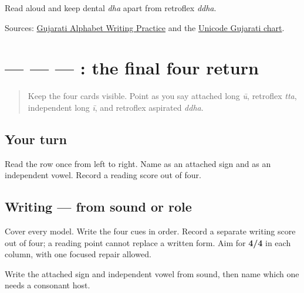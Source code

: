 \begin{tcolorbox}[breakable,colback=teal!4,colframe=teal!35!black,title={Before you move on}]
Read \textbf{ } aloud and keep dental \emph{dha} apart from retroflex \emph{ddha}.

Sources: \href{https://www.t30apps.com/gujarati-alphabet-writing/}{Gujarati Alphabet Writing Practice} and the \href{https://www.unicode.org/charts/PDF/U0A80.pdf}{Unicode Gujarati chart}.
\end{tcolorbox}
\section[\texorpdfstring{\gu{ૂ} — \gu{ટ} — \gu{ઈ} — \gu{ઢ} (attached long uu …)}{ૂ — ટ — ઈ — ઢ (attached long uu …)}]{ —  —  — : the final four return}

\label{lesson:GU-R07-second-four-r1}



\begin{quote}
Keep the four cards visible. Point as you say attached long \emph{ū}, retroflex \emph{tta}, independent long \emph{ī}, and retroflex aspirated \emph{ddha}.
\end{quote}

\subsection*{Your turn}
Read the row once from left to right. Name \textbf{} as an attached sign and \textbf{} as an independent vowel. Record a reading score out of four.

\subsection*{Writing — from sound or role}
Cover every model. Write the four cues in order. Record a separate writing score out of four; a reading point cannot replace a written form. Aim for \textbf{4/4} in each column, with one focused repair allowed.

\begin{tcolorbox}[breakable,colback=teal!4,colframe=teal!35!black,title={Before you move on}]
Write the attached sign and independent vowel from sound, then name which one needs a consonant host.
\end{tcolorbox}
